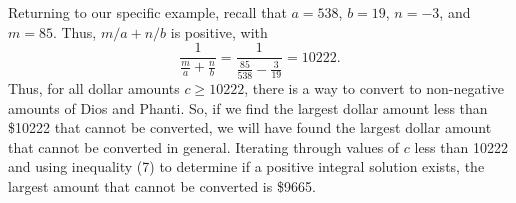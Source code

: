 \documentclass{article}
\begin{document}
Returning to our specific example, recall that $a = 538$, $b = 19$, $n = -3$, and $m = 85$. Thus, $m / a + n / b$ is positive, with
\begin{equation}
	\frac{1}{\frac{m}{a} + \frac{n}{b}} = \frac{1}{\frac{85}{538} - \frac{3}{19}} = 10222.
\end{equation}
Thus, for all dollar amounts $c\geq 10222$, there is a way to convert to non-negative amounts of Dios and Phanti. So, if we find the largest dollar amount less than \$10222 that cannot be converted, we will have found the largest dollar amount that cannot be converted in general. Iterating through values of $c$ less than 10222 and using inequality (7) to determine if a positive integral solution exists, the largest amount that cannot be converted is \$9665.
\end{document}
